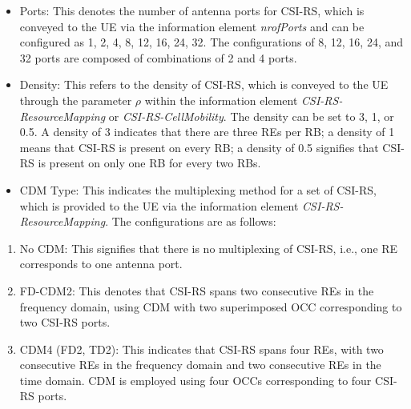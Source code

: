 \documentclass[lettersize,journal]{IEEEtran}
\begin{document}
\begin{appendices}
\begin{itemize}
    \item Ports: This denotes the number of antenna ports for CSI-RS, which is conveyed to the UE via the information element \emph{nrofPorts} and can be configured as {1, 2, 4, 8, 12, 16, 24, 32}. The configurations of 8, 12, 16, 24, and 32 ports are composed of combinations of 2 and 4 ports.

    \item Density: This refers to the density of CSI-RS, which is conveyed to the UE through the parameter $\rho$ within the information element \emph{CSI-RS-ResourceMapping} or \emph{CSI-RS-CellMobility}. The density can be set to 3, 1, or 0.5. A density of 3 indicates that there are three REs per RB; a density of 1 means that CSI-RS is present on every RB; a density of 0.5 signifies that CSI-RS is present on only one RB for every two RBs. 

    \item CDM Type: This indicates the multiplexing method for a set of CSI-RS, which is provided to the UE via the information element \emph{CSI-RS-ResourceMapping}. The configurations are as follows:
\end{itemize}
\begin{enumerate}
    \item No CDM: This signifies that there is no multiplexing of CSI-RS, i.e., one RE corresponds to one antenna port.
    \item FD-CDM2: This denotes that CSI-RS spans two consecutive REs in the frequency domain, using CDM with two superimposed OCC corresponding to two CSI-RS ports.
    \item CDM4 (FD2, TD2): This indicates that CSI-RS spans four REs, with two consecutive REs in the frequency domain and two consecutive REs in the time domain. CDM is employed using four OCCs corresponding to four CSI-RS ports.
\end{enumerate}




\end{appendices}
\end{document}
